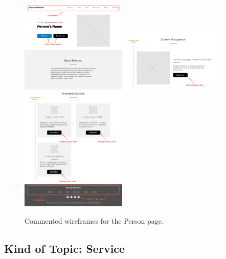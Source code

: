 \documentclass[12pt]{report}
\begin{document}
\begin{figure}[H]
	\centering
	\includegraphics[width=0.45\textwidth]{low_fid_wireframes/person/1.png}
	\includegraphics[width=0.45\textwidth]{low_fid_wireframes/person/2.png}
	\includegraphics[width=0.45\textwidth]{low_fid_wireframes/person/3.png}
	\caption{Commented wireframes for the Person page.}
\end{figure}

\subsection{Kind of Topic: Service}
\end{document}
